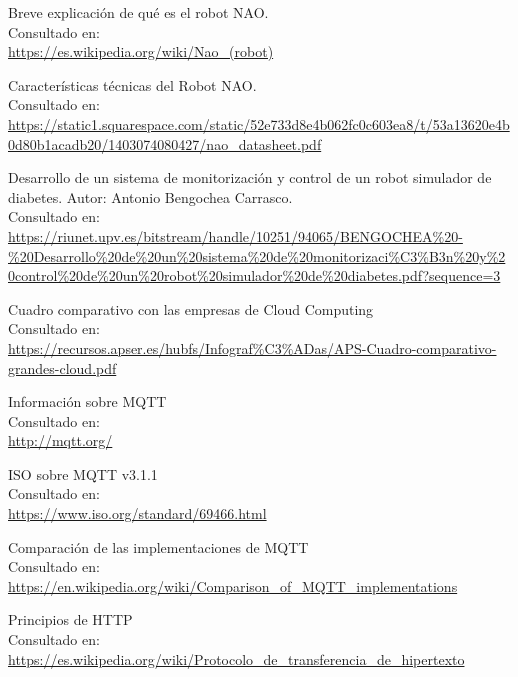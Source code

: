 \documentclass[12pt,spanish,listoffigures,listoftables]{tfgetsinf}
\begin{document}
\begin{thebibliography}{10}

   Breve explicación de qué es el robot NAO. \\
   \newblock Consultado en: \\ 
   \url{https://es.wikipedia.org/wiki/Nao_(robot)}
   
	Características técnicas del Robot NAO. \\
	\newblock Consultado en: \\
   	\url{https://static1.squarespace.com/static/52e733d8e4b062fc0c603ea8/t/53a13620e4b0d80b1acadb20/1403074080427/nao_datasheet.pdf}

	Desarrollo de un sistema de monitorización y control de un robot simulador de diabetes. Autor: Antonio Bengochea Carrasco. \\
	\newblock Consultado en: \\
	\url{https://riunet.upv.es/bitstream/handle/10251/94065/BENGOCHEA\%20-\%20Desarrollo\%20de\%20un\%20sistema\%20de\%20monitorizaci\%C3\%B3n\%20y\%20control\%20de\%20un\%20robot\%20simulador\%20de\%20diabetes.pdf?sequence=3}
	
	Cuadro comparativo con las empresas de Cloud Computing \\
	\newblock Consultado en: \\
	\url{https://recursos.apser.es/hubfs/Infograf\%C3\%ADas/APS-Cuadro-comparativo-grandes-cloud.pdf}
	
	Información sobre MQTT \\
	\newblock Consultado en: \\
	\url{http://mqtt.org/}
	
	ISO sobre MQTT v3.1.1 \\
	\newblock Consultado en: \\
	\url{https://www.iso.org/standard/69466.html}
	
	Comparación de las implementaciones de MQTT \\
	\newblock Consultado en: \\
	\url{https://en.wikipedia.org/wiki/Comparison_of_MQTT_implementations}

	Principios de HTTP \\
	\newblock Consultado en: \\
	\url{https://es.wikipedia.org/wiki/Protocolo_de_transferencia_de_hipertexto}
	

\end{thebibliography}
\end{document}
